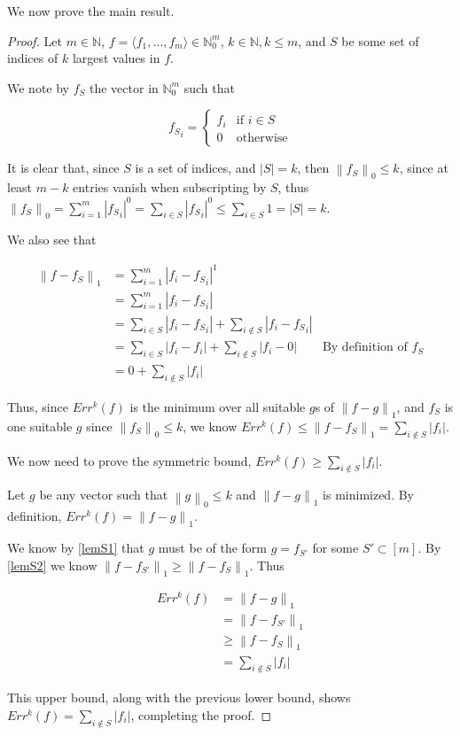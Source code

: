 \documentclass[11pt]{amsart}
\newcommand{\norm}[1]{\left\lVert #1 \right\rVert}
\begin{document}
We now prove the main result.
\begin{proof}
Let $m \in \mathbb{N}$, $f = \langle f_1, \dots, f_m \rangle \in \mathbb{N}_0^m$, $k \in \mathbb{N}, k \le m$, and $S$ be some set of indices of $k$ largest values in $f$.

We note by $f_S$ the vector in $\mathbb{N}_0^m$ such that

$$
{f_S}_i = \begin{cases}
f_i & \text{if } i \in S\\
0 & \text{otherwise}
\end{cases}
$$

It is clear that, since $S$ is a set of indices, and $|S| = k$, then $\norm{f_S}_0 \le k$, since at least $m - k$ entries vanish when subscripting by $S$, thus $\norm{f_S}_0 = \sum_{i=1}^m |{f_S}_i|^0 = \sum_{i \in S} |{f_S}_i|^0 \le \sum_{i \in S} 1 = |S| = k$.

We also see that

\begin{align*}
\norm{f - f_S}_1 &= \sum_{i = 1}^m |f_i - {f_S}_i|^1\\
                 &= \sum_{i = 1}^m |f_i - {f_S}_i|\\
                 &= \sum_{i \in S} |f_i - {f_S}_i| + \sum_{i \not\in S} |f_i - {f_S}_i|\\
                 &= \sum_{i \in S} |f_i - f_i| + \sum_{i \not\in S} |f_i - 0| & \text{By definition of $f_S$}\\
                 &= 0 + \sum_{i \not\in S} |f_i|
\end{align*}

Thus, since $Err^k(f)$ is the minimum over all suitable $g$s of $\norm{f - g}_1$, and $f_S$ is one suitable $g$ since $\norm{f_S}_0 \le k$, we know $Err^k(f) \le \norm{f - f_S}_1 =  \sum_{i \not\in S} |f_i|$.

We now need to prove the symmetric bound, $Err^k(f) \ge \sum_{i \not\in S} |f_i|$.

Let $g$ be any vector such that $\norm{g}_0 \le k$ and $\norm{f - g}_1$ is minimized. By definition, $Err^k(f) = \norm{f - g}_1$.


We know by \ref{lemS1} that $g$ must be of the form $g = f_{S'}$ for some $S' \subset [m]$. By \ref{lemS2} we know $\norm{f - f_{S'}}_1 \ge \norm{f - f_S}_1$. Thus

\begin{align*}
Err^k(f) &= \norm{f - g}_1\\
         &= \norm{f - f_{S'}}_1\\
         &\ge \norm{f - f_S}_1\\
         &= \sum_{i \not\in S} |f_i|
\end{align*}

This upper bound, along with the previous lower bound, shows $Err^k(f) = \sum_{i \not\in S} |f_i|$, completing the proof.
\end{proof}
\end{document}
